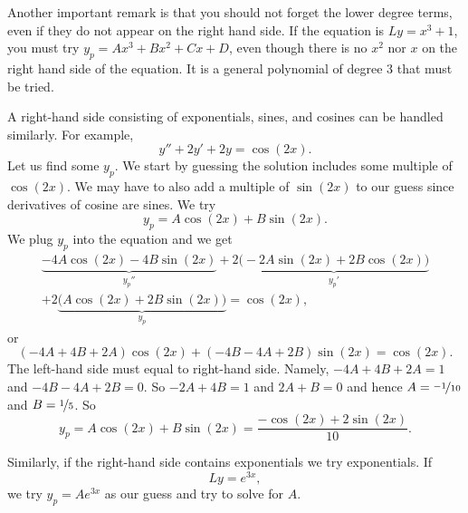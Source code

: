 Another important remark is that you should not forget the lower degree
terms, even if they do not appear on the right hand side.  If the equation
is $Ly=x^3+1$, you must try $y_p = Ax^3+Bx^2+Cx+D$, even though there is
no $x^2$ nor $x$ on the right hand side of the equation.  It is
a general polynomial of degree 3 that must be tried.

\medskip

A right-hand side consisting of exponentials, sines, and cosines
can be handled similarly.  For example,
\begin{equation*}
y''+2y'+2y = \cos (2x) .
\end{equation*}
Let us find some $y_p$.  We start by guessing the solution
includes some multiple of $\cos(2x)$.
We may have to also
add a multiple of $\sin (2x)$ to our guess since derivatives of cosine are
sines.  We try
\begin{equation*}
y_p = A \cos (2x) + B \sin (2x) .
\end{equation*}
We plug $y_p$ into the equation and we get
\begin{multline*}
\underbrace{-4 A \cos (2x) - 4 B \sin (2x)}_{y_p''}
+2 \underbrace{\bigl(-2A \sin (2x) + 2B \cos (2x)\bigr)}_{y_p'}
\\
+
2 \underbrace{\bigl(A \cos (2x) + 2B \sin (2x)\bigr)}_{y_p}
= \cos (2x) ,
\end{multline*}
or
\begin{equation*}
(-4A+4B+2A) \cos(2x) +
(-4B-4A+2B) \sin(2x)
= \cos(2x) .
\end{equation*}
The left-hand side must equal to right-hand side.  Namely,
$-4A + 4B + 2A = 1$ and
$-4B - 4A + 2B = 0$.  So $-2A+4B =1$ and $2A+B=0$ and hence
$A=\nicefrac{-1}{10}$ and $B=\nicefrac{1}{5}$.  So
\begin{equation*}
y_p = A \cos (2x) + B \sin (2x) = \frac{-\cos (2x) + 2 \sin (2x)}{10} .
\end{equation*}

Similarly, if the right-hand side contains exponentials we try
exponentials.  If
\begin{equation*}
Ly = e^{3x},
\end{equation*}
we try $y_p = A e^{3x}$ as our guess and try to solve for $A$.

\medskip

